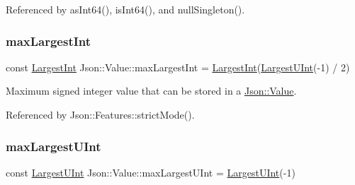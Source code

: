 Referenced by as\+Int64(), is\+Int64(), and null\+Singleton().

\mbox{\label{classJson_1_1Value_a8b4977696f13296fa8755c7953fafb2f_a8b4977696f13296fa8755c7953fafb2f}} 
\subsubsection{\texorpdfstring{max\+Largest\+Int}{maxLargestInt}}
{\footnotesize\ttfamily const \hyperlink{classJson_1_1Value_a1cbb82642ed05109b9833e49f042ece7_a1cbb82642ed05109b9833e49f042ece7}{Largest\+Int} Json\+::\+Value\+::max\+Largest\+Int = \hyperlink{classJson_1_1Value_a1cbb82642ed05109b9833e49f042ece7_a1cbb82642ed05109b9833e49f042ece7}{Largest\+Int}(\hyperlink{classJson_1_1Value_a6682a3684d635e03fc06ba229fa24eec_a6682a3684d635e03fc06ba229fa24eec}{Largest\+U\+Int}(-\/1) / 2)\hspace{0.3cm}{\ttfamily [static]}}



Maximum signed integer value that can be stored in a \hyperlink{classJson_1_1Value}{Json\+::\+Value}. 



Referenced by Json\+::\+Features\+::strict\+Mode().

\mbox{\label{classJson_1_1Value_a8ddb32d9d55fa5323ae5135639dc2e31_a8ddb32d9d55fa5323ae5135639dc2e31}} 
\subsubsection{\texorpdfstring{max\+Largest\+U\+Int}{maxLargestUInt}}
{\footnotesize\ttfamily const \hyperlink{classJson_1_1Value_a6682a3684d635e03fc06ba229fa24eec_a6682a3684d635e03fc06ba229fa24eec}{Largest\+U\+Int} Json\+::\+Value\+::max\+Largest\+U\+Int = \hyperlink{classJson_1_1Value_a6682a3684d635e03fc06ba229fa24eec_a6682a3684d635e03fc06ba229fa24eec}{Largest\+U\+Int}(-\/1)\hspace{0.3cm}{\ttfamily [static]}}




